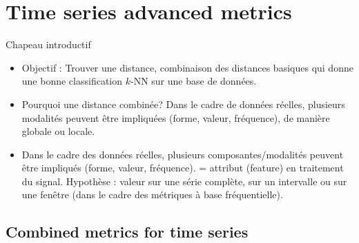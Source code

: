 \chapter{Time series advanced metrics}
\label{sec:unchapitre}
\minitoc

\noindent Chapeau introductif
\begin{itemize}
	\item Objectif : Trouver une distance, combinaison des distances basiques qui donne une bonne classification $k$-NN sur une base de données.
	\item Pourquoi une distance combinée? Dans le cadre de données réelles, plusieurs modalités peuvent être impliquées (forme, valeur, fréquence), de manière globale ou locale.
	\item Dans le cadre des données réelles, plusieurs composantes/modalités peuvent être impliqués (forme, valeur, fréquence). = attribut (feature) en traitement du signal. Hypothèse : valeur sur une série complète, sur un intervalle ou sur une fenêtre (dans le cadre des métriques à base fréquentielle).
\end{itemize}

\section{Combined metrics for time series}

